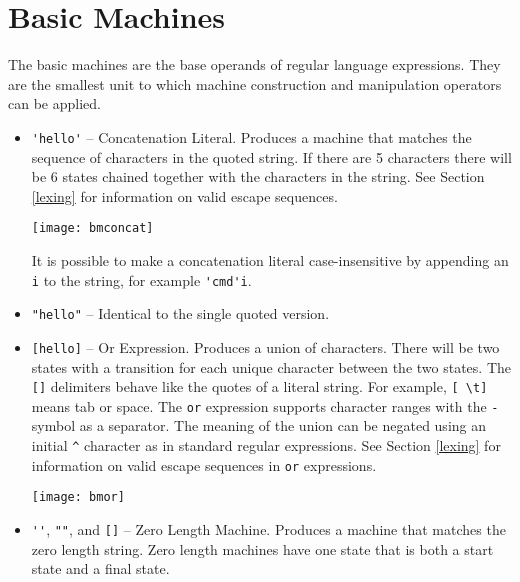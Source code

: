 \documentclass[letterpaper,11pt,oneside]{book}
\newcommand{\graphspace}{\vspace{10pt}}
\begin{document}
\section{Basic Machines}
\label{basic}

The basic machines are the base operands of regular language expressions. They
are the smallest unit to which machine construction and manipulation operators
can be applied.

\begin{itemize}

\item \verb|'hello'| -- Concatenation Literal. Produces a machine that matches
the sequence of characters in the quoted string. If there are 5 characters
there will be 6 states chained together with the characters in the string. See
Section \ref{lexing} for information on valid escape sequences. 


\graphspace
\begin{center}
\texttt{[image: bmconcat]}
\end{center}
\graphspace

It is possible
to make a concatenation literal case-insensitive by appending an \verb|i| to
the string, for example \verb|'cmd'i|.

\item \verb|"hello"| -- Identical to the single quoted version.

\item \verb|[hello]| -- Or Expression. Produces a union of characters.  There
will be two states with a transition for each unique character between the two states.
The \verb|[]| delimiters behave like the quotes of a literal string. For example, 
\verb|[ \t]| means tab or space. The \verb|or| expression supports character ranges
with the \verb|-| symbol as a separator. The meaning of the union can be negated
using an initial \verb|^| character as in standard regular expressions. 
See Section \ref{lexing} for information on valid escape sequences
in \verb|or| expressions.


\graphspace
\begin{center}
\texttt{[image: bmor]}
\end{center}
\graphspace

\item \verb|''|, \verb|""|, and \verb|[]| -- Zero Length Machine.  Produces a machine
that matches the zero length string. Zero length machines have one state that is both
a start state and a final state.



\end{itemize}
\end{document}
